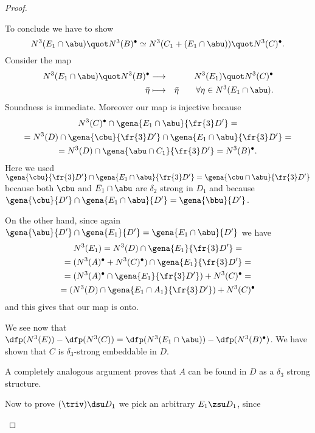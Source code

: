 \begin{proof}
\begin{description}
To conclude we have to show
$$N^{3}(E_{1}\cap \abu)\quot N^{3}(B)^{\bullet}\simeq
N^{3}(C_{1}+(E_{1}\cap \abu))\quot N^{3}(C)^{\bullet}.$$
Consider the map
\begin{eqnarray*}
N^{3}(E_{1}\cap \abu)\quot N^{3}(B)^{\bullet}&\longrightarrow&N^{3}(E_{1})\quot N^{3}(C)^{\bullet}\\
\bar\eta&\longmapsto&\bar\eta\quad\quad\forall\eta\in N^{3}(E_{1}\cap\abu).
\end{eqnarray*}
Soundness is immediate. Moreover our map is injective because
\begin{multline*}
N^{3}(C)^{\bullet}\cap\gena{E_{1}\cap \abu}{\fr{3}D^{\prime}}=\\
=N^{3}(D)\cap\gena{\cbu}{\fr{3}D^{\prime}}\cap\gena{E_{1}\cap \abu}{\fr{3}D^{\prime}}=\\
=N^{3}(D)\cap\gena{\abu\cap C_{1}}{\fr{3}D^{\prime}}=N^{3}(B)^{\bullet}.
\end{multline*}
Here we used $\gena{\cbu}{\fr{3}D^{\prime}}\cap\gena{E_{1}\cap\abu}{\fr{3}D^{\prime}}=
\gena{\cbu\cap\abu}{\fr{3}D^{\prime}}$ because both $\cbu$ and $E_{1}\cap\abu$ are $\delta_{2}$ strong in $D_{1}$ and because $\gena{\cbu}{D^{\prime}}\cap\gena{E_{1}\cap\abu}{D^{\prime}}=\gena{\bbu}{D^{\prime}}$.

On the other hand, since again $\gena{\abu}{D^{\prime}}\cap\gena{E_{1}}{D^{\prime}}=\gena{E_{1}\cap\abu}{D^{\prime}}$ we have
\begin{multline*}
N^{3}(E_{1})=N^{3}(D)\cap\gena{E_{1}}{\fr{3}D^{\prime}}=\\
=(N^{3}(A)^{\bullet}+N^{3}(C)^{\bullet})\cap\gena{E_{1}}{\fr{3}D^{\prime}}=\\
=(N^{3}(A)^{\bullet}\cap\gena{E_{1}}{\fr{3}D^{\prime}})+N^{3}(C)^{\bullet}=\\
=(N^{3}(D)\cap\gena{E_{1}\cap A_{1}}{\fr{3}D^{\prime}})+N^{3}(C)^{\bullet}
\end{multline*}
and this gives that our map is onto.

We see now that $\dfp(N^{3}(E))-\dfp(N^{3}(C))=\dfp(N^{3}(E_{1}\cap\abu))-\dfp(N^{3}(B)^{\bullet})$.
We have shown that $C$ is $\delta_{3}$-strong embeddable in $D$.

A completely analogous argument proves that $A$ can be found in $D$ as a $\delta_{3}$ strong structure.

Now to prove $(\triv)\dsu D_{1}$ we pick an arbitrary $E_{1}\zsu D_{1}$, since



\end{description}
\end{proof}
